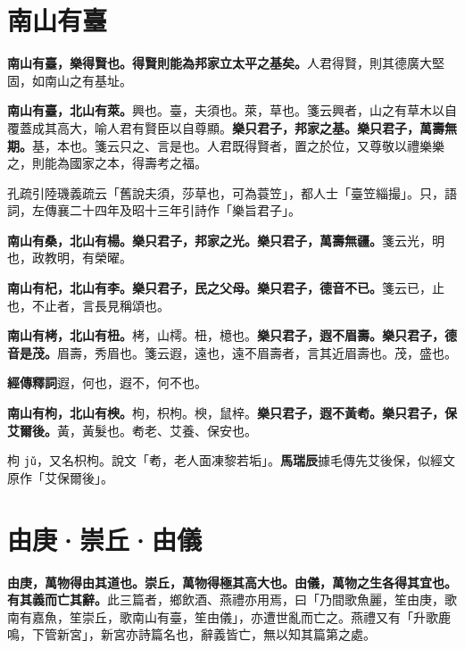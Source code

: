 \section{南山有臺}


\textbf{南山有臺，樂得賢也。得賢則能為邦家立太平之基矣。}{\footnotesize 人君得賢，則其德廣大堅固，如南山之有基址。}

\textbf{南山有臺，北山有萊。}{\footnotesize 興也。臺，夫須也。萊，草也。箋云興者，山之有草木以自覆蓋成其高大，喻人君有賢臣以自尊顯。}\textbf{樂只君子，邦家之基。樂只君子，萬壽無期。}{\footnotesize 基，本也。箋云只之、言是也。人君既得賢者，置之於位，又尊敬以禮樂樂之，則能為國家之本，得壽考之福。}

\begin{quoting}孔疏引陸璣義疏云「舊說夫須，莎草也，可為蓑笠」，都人士「臺笠緇撮」。只，語詞，左傳襄二十四年及昭十三年引詩作「樂旨君子」。\end{quoting}

\textbf{南山有桑，北山有楊。樂只君子，邦家之光。樂只君子，萬壽無疆。}{\footnotesize 箋云光，明也，政教明，有榮曜。}

\textbf{南山有杞，北山有李。樂只君子，民之父母。樂只君子，德音不已。}{\footnotesize 箋云已，止也，不止者，言長見稱頌也。}

\textbf{南山有栲，北山有杻。}{\footnotesize 栲，山樗。杻，檍也。}\textbf{樂只君子，遐不眉壽。樂只君子，德音是茂。}{\footnotesize 眉壽，秀眉也。箋云遐，遠也，遠不眉壽者，言其近眉壽也。茂，盛也。}

\begin{quoting}\textbf{經傳釋詞}遐，何也，遐不，何不也。\end{quoting}

\textbf{南山有枸，北山有楰。}{\footnotesize 枸，枳枸。楰，鼠梓。}\textbf{樂只君子，遐不黃耇。樂只君子，保艾爾後。}{\footnotesize 黃，黃髮也。耇老、艾養、保安也。}

\begin{quoting}枸 \texttt{jǔ}，又名枳枸。說文「耇，老人面凍黎若垢」。\textbf{馬瑞辰}據毛傳先艾後保，似經文原作「艾保爾後」。\end{quoting}

\section*{由庚·崇丘·由儀}

\textbf{由庚，萬物得由其道也。崇丘，萬物得極其高大也。由儀，萬物之生各得其宜也。有其義而亡其辭。}{\footnotesize 此三篇者，鄉飲酒、燕禮亦用焉，曰「乃間歌魚麗，笙由庚，歌南有嘉魚，笙崇丘，歌南山有臺，笙由儀」，亦遭世亂而亡之。燕禮又有「升歌鹿鳴，下管新宮」，新宮亦詩篇名也，辭義皆亡，無以知其篇第之處。}


